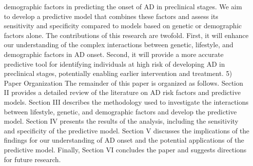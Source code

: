 \documentclass[conference]{IEEEtran}
\begin{document}
demographic factors in predicting the onset of AD in preclinical stages. We aim to develop a predictive model that combines these factors and assess its sensitivity and specificity compared to models based on genetic or demographic factors alone. The contributions of this research are twofold. First, it will enhance our understanding of the complex interactions between genetic, lifestyle, and demographic factors in AD onset. Second, it will provide a more accurate predictive tool for identifying individuals at high risk of developing AD in preclinical stages, potentially enabling earlier intervention and treatment. 5) Paper Organization The remainder of this paper is organized as follows. Section II provides a detailed review of the literature on AD risk factors and predictive models. Section III describes the methodology used to investigate the interactions between lifestyle, genetic, and demographic factors and develop the predictive model. Section IV presents the results of the analysis, including the sensitivity and specificity of the predictive model. Section V discusses the implications of the findings for our understanding of AD onset and the potential applications of the predictive model. Finally, Section VI concludes the paper and suggests directions for future research.
\end{document}
